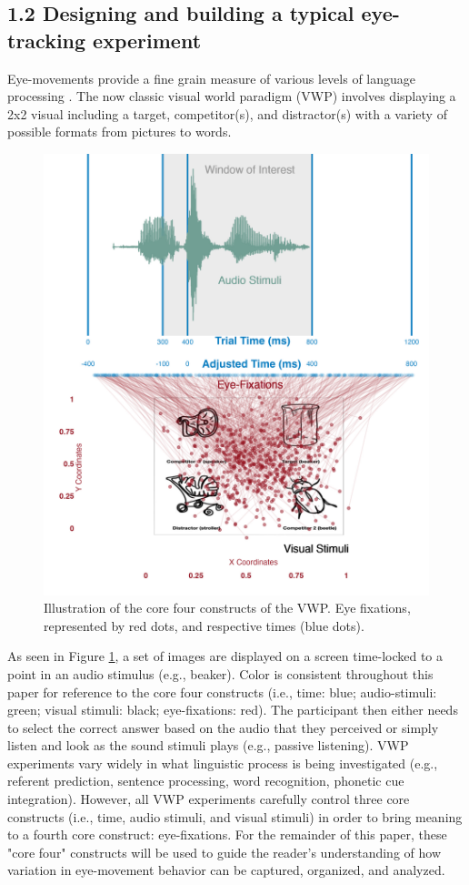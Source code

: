 \subsection{1.2 Designing and building a typical eye-tracking experiment}
Eye-movements provide a fine grain measure of various levels of language processing
\parencite[e.g.][]{Tanenhaus_Spivey-Knowlton_Eberhard_Sedivy_1995,Allopenna_1998,Cooper}. The now classic visual world paradigm (VWP) involves displaying a 2x2 visual including a target, competitor(s), and distractor(s) with a variety of possible formats from pictures to words.

\begin{figure}[ht]
    \centering
    \includegraphics[height=.8\textwidth]{figures/Core_four_R.jpeg}
    \caption{Illustration of the core four constructs of the VWP. Eye fixations, represented by red dots, and respective times (blue dots).}
    \label{fig:core_four}
\end{figure}

As seen in Figure \ref{fig:core_four}, a set of images are displayed on a screen time-locked to a point in an audio stimulus (e.g., beaker). Color is consistent throughout this paper for reference to the core four constructs (i.e., time: blue; audio-stimuli: green; visual stimuli: black; eye-fixations: red). The participant then either needs to select the correct answer based on the audio that they perceived or simply listen and look as the sound stimuli plays (e.g., passive listening). VWP experiments vary widely in what linguistic process is being investigated (e.g., referent prediction, sentence processing, word recognition, phonetic cue integration). However, all VWP experiments carefully control three core constructs (i.e., time, audio stimuli, and visual stimuli) in order to bring meaning to a fourth core construct: eye-fixations. For the remainder of this paper, these "core four" constructs will be used to guide the reader's understanding of how variation in eye-movement behavior can be captured, organized, and analyzed. 
\newline

